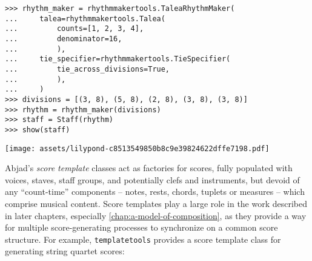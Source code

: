 \begin{abjadbookoutput}
\begin{singlespacing}
\vspace{-0.5\baselineskip}
\begin{verbatim}
>>> rhythm_maker = rhythmmakertools.TaleaRhythmMaker(
...     talea=rhythmmakertools.Talea(
...         counts=[1, 2, 3, 4],
...         denominator=16,
...         ),
...     tie_specifier=rhythmmakertools.TieSpecifier(
...         tie_across_divisions=True,
...         ),
...     )
>>> divisions = [(3, 8), (5, 8), (2, 8), (3, 8), (3, 8)]
>>> rhythm = rhythm_maker(divisions)
>>> staff = Staff(rhythm)
>>> show(staff)
\end{verbatim}
\noindent\texttt{[image: assets/lilypond-c8513549850b8c9e39824622dffe7198.pdf]}
\end{singlespacing}
\end{abjadbookoutput}

\noindent Abjad's \emph{score template} classes act as factories for scores,
fully populated with voices, staves, staff groups, and potentially clefs and
instruments, but devoid of any \enquote{count-time} components -- notes, rests,
chords, tuplets or measures -- which comprise musical content. Score templates
play a large role in the work described in later chapters, especially
\autoref{chap:a-model-of-composition}, as they provide a way for multiple
score-generating processes to synchronize on a common score structure. For
example, \texttt{templatetools} provides a score template class for generating
string quartet scores:

\begin{comment}
<abjad>
score_template = templatetools.StringQuartetScoreTemplate()
score = score_template()
print(format(score))
</abjad>
\end{comment}

